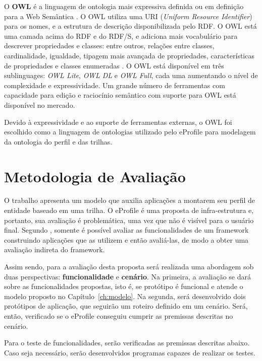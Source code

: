 O \textbf{OWL} é a linguagem de ontologia mais expressiva definida ou em definição para a Web Semântica \cite{daconta03}. O OWL utiliza uma URI (\emph{Uniform Resource Identifier}) para os nomes, e a estrutura de descrição disponibilizada pelo RDF. O OWL está uma camada acima do RDF e do RDF/S, e adiciona mais vocabulário para descrever propriedades e classes: entre outros, relações entre classes, cardinalidade, igualdade, tipagem mais avançada de propriedades, características de propriedades e classes enumeradas \cite{owl-guide}. O OWL está disponível em três sublinguages: \emph{OWL Lite}, \emph{OWL DL} e \emph{OWL Full}, cada uma aumentando o nível de complexidade e expressividade. Um grande número de ferramentas com capacidade para edição e raciocínio semântico com suporte para OWL está disponível no mercado.

Devido à expressividade e ao suporte de ferramentas externas, o OWL foi escolhido como a linguagem de ontologias utilizado pelo eProfile para modelagem da ontologia do perfil e das trilhas.


\section{Metodologia de Avaliação}
\label{sec:avaliacao}

O trabalho apresenta um modelo que auxilia aplicações a montarem seu perfil de entidade baseado em uma trilha. O eProfile é uma proposta de infra-estrutura e, portanto, sua avaliação é problemática, uma vez que não é visível para o usuário final. Segundo , somente é possível avaliar as funcionalidades de um framework construindo aplicações que as utilizem e então avaliá-las, de modo a obter uma avaliação indireta do framework.

Assim sendo, para a avaliação desta proposta será realizada uma abordagem sob duas perspectivas: {\bf funcionalidade} e {\bf cenário}. Na primeira, a avaliação se dará sobre as funcionalidades propostas, isto é, se protótipo é funcional e atende o modelo proposto no Capítulo~\ref{ch:modelo}. Na segunda, será desenvolvido dois protótipos de aplicação, que seguirão um roteiro definido em um cenário. Será, então, verificado se o eProfile conseguiu cumprir as premissas descritas no cenário.

Para o teste de funcionalidades, serão verificadas as premissas descritas abaixo. Caso seja necessário, serão desenvolvidos programas capazes de realizar os testes.

